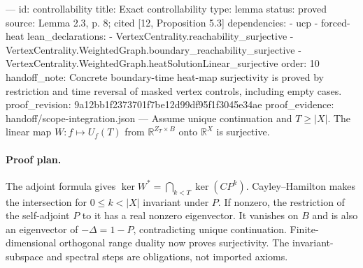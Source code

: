 ---
id: controllability
title: Exact controllability
type: lemma
status: proved
source: Lemma 2.3, p. 8; cited [12, Proposition 5.3]
dependencies:
- ucp
- forced-heat
lean_declarations:
- VertexCentrality.reachability_surjective
- VertexCentrality.WeightedGraph.boundary_reachability_surjective
- VertexCentrality.WeightedGraph.heatSolutionLinear_surjective
order: 10
handoff_note: Concrete boundary-time heat-map surjectivity is proved by restriction and time reversal of masked vertex controls, including empty cases.
proof_revision: 9a12bb1f2373701f7be12d99df95f1f3045e34ae
proof_evidence: handoff/scope-integration.json
---
Assume unique continuation and $T\geq|X|$. The linear map $W:f\mapsto U_f(T)$ from $\mathbb R^{Z_T\times B}$ onto $\mathbb R^X$ is surjective.

\paragraph{Proof plan.}
The adjoint formula gives $\ker W^*=\bigcap_{k<T}\ker(CP^k)$. Cayley--Hamilton makes the intersection for $0\leq k<|X|$ invariant under $P$. If nonzero, the restriction of the self-adjoint $P$ to it has a real nonzero eigenvector. It vanishes on $B$ and is also an eigenvector of $-\Delta=1-P$, contradicting unique continuation. Finite-dimensional orthogonal range duality now proves surjectivity. The invariant-subspace and spectral steps are obligations, not imported axioms.

